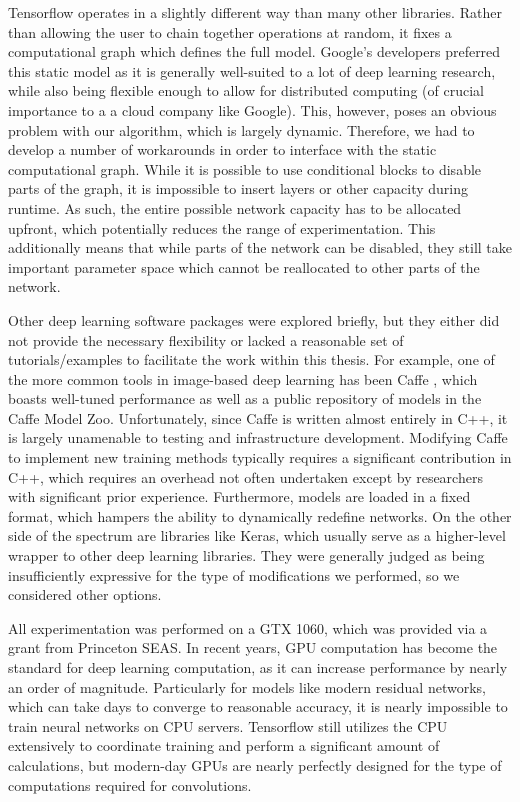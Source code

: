 Tensorflow operates in a slightly different way than many other libraries.
Rather than allowing the user to chain together operations at random, it fixes a computational graph which defines the full model.
Google's developers preferred this static model as it is generally well-suited to a lot of deep learning research, while also being flexible enough to allow for distributed computing (of crucial importance to a a cloud company like Google).
This, however, poses an obvious problem with our algorithm, which is largely dynamic.
Therefore, we had to develop a number of workarounds in order to interface with the static computational graph.
While it is possible to use conditional blocks to disable parts of the graph, it is impossible to insert layers or other capacity during runtime.
As such, the entire possible network capacity has to be allocated upfront, which potentially reduces the range of experimentation.
This additionally means that while parts of the network can be disabled, they still take important parameter space which cannot be reallocated to other parts of the network.

Other deep learning software packages were explored briefly, but they either did not provide the necessary flexibility or lacked a reasonable set of tutorials/examples to facilitate the work within this thesis.
For example, one of the more common tools in image-based deep learning has been Caffe \cite{jia2014caffe}, which boasts well-tuned performance as well as a public repository of models in the Caffe Model Zoo.
Unfortunately, since Caffe is written almost entirely in C++, it is largely unamenable to testing and infrastructure development.
Modifying Caffe to implement new training methods typically requires a significant contribution in C++, which requires an overhead not often undertaken except by researchers with significant prior experience.
Furthermore, models are loaded in a fixed format, which hampers the ability to dynamically redefine networks.
On the other side of the spectrum are libraries like Keras, which usually serve as a higher-level wrapper to other deep learning libraries.
They were generally judged as being insufficiently expressive for the type of modifications we performed, so we considered other options.

All experimentation was performed on a GTX 1060, which was provided via a grant from Princeton SEAS.
In recent years, GPU computation has become the standard for deep learning computation, as it can increase performance by nearly an order of magnitude.
Particularly for models like modern residual networks, which can take days to converge to reasonable accuracy, it is nearly impossible to train neural networks on CPU servers.
Tensorflow still utilizes the CPU extensively to coordinate training and perform a significant amount of calculations, but modern-day GPUs are nearly perfectly designed for the type of computations required for convolutions.

